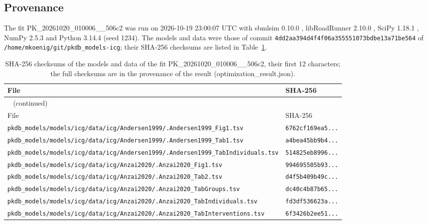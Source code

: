 \subsection{Provenance}

The fit PK\_20261020\_010006\_\_506c2 was run on 2026-10-19 23:00:07 UTC with sbmlsim 0.10.0 \cite{Koenig2026_sbmlsim}, libRoadRunner 2.10.0 \cite{Welsh2023}, SciPy 1.18.1 \cite{Virtanen2020}, NumPy 2.5.3 \cite{Harris2020} and Python 3.14.4 (seed 1234). The models and data were those of commit \texttt{4dd2aa394d4f4f06a355551073bdbe13a71be564} of \texttt{/home/mkoenig/git/pkdb\_models-icg}; their SHA-256 checksums are listed in Table~\ref{tab:checksums:PK_20261020_010006__506c2}.

\begin{longtable}{ll}
\caption{SHA-256 checksums of the models and data of the fit PK\_20261020\_010006\_\_506c2, their first 12 characters; the full checksums are in the provenance of the result (optimization\_result.json).}\label{tab:checksums:PK_20261020_010006__506c2} \\
\toprule
File & SHA-256 \\
\midrule
\endfirsthead
\multicolumn{2}{l}{\small\tablename~\thetable{} (continued)} \\
\toprule
File & SHA-256 \\
\midrule
\endhead
\bottomrule
\endlastfoot
\texttt{pkdb\_models/models/icg/data/icg/Andersen1999/.Andersen1999\_Fig1.tsv} & \texttt{6762cf169ea5...} \\
\texttt{pkdb\_models/models/icg/data/icg/Andersen1999/.Andersen1999\_Tab1.tsv} & \texttt{a4bea45bb9b4...} \\
\texttt{pkdb\_models/models/icg/data/icg/Andersen1999/.Andersen1999\_TabIndividuals.tsv} & \texttt{514825eb8996...} \\
\texttt{pkdb\_models/models/icg/data/icg/Anzai2020/.Anzai2020\_Fig1.tsv} & \texttt{994695505b93...} \\
\texttt{pkdb\_models/models/icg/data/icg/Anzai2020/.Anzai2020\_Tab2.tsv} & \texttt{d4f5b409b49c...} \\
\texttt{pkdb\_models/models/icg/data/icg/Anzai2020/.Anzai2020\_TabGroups.tsv} & \texttt{dc40c4b87b65...} \\
\texttt{pkdb\_models/models/icg/data/icg/Anzai2020/.Anzai2020\_TabIndividuals.tsv} & \texttt{fd3df536623a...} \\
\texttt{pkdb\_models/models/icg/data/icg/Anzai2020/.Anzai2020\_TabInterventions.tsv} & \texttt{6f3426b2ee51...} \\

\end{longtable}
